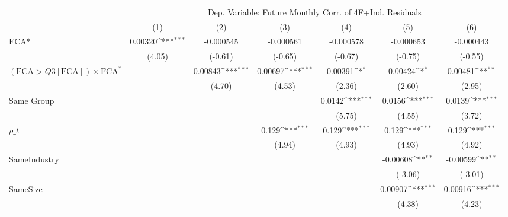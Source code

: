 {
\def\sym#1{\ifmmode^{#1}\else\(^{#1}\)\fi}
\begin{tabular}{l*{6}{c}}
\hline\hline
                &\multicolumn{6}{c}{Dep. Variable: Future Monthly Corr. of 4F+Ind. Residuals}                                     \\\cmidrule(lr){2-7}
                &\multicolumn{1}{c}{(1)}         &\multicolumn{1}{c}{(2)}         &\multicolumn{1}{c}{(3)}         &\multicolumn{1}{c}{(4)}         &\multicolumn{1}{c}{(5)}         &\multicolumn{1}{c}{(6)}         \\
\hline
$ \text{FCA*} $ &  0.00320\sym{***}&-0.000545         &-0.000561         &-0.000578         &-0.000653         &-0.000443         \\
                &   (4.05)         &  (-0.61)         &  (-0.65)         &  (-0.67)         &  (-0.75)         &  (-0.55)         \\
[1em]
 $ (\text{FCA} > Q3[\text{FCA}]) \times {\text{FCA} ^*}  $ &                  &  0.00843\sym{***}&  0.00697\sym{***}&  0.00391\sym{*}  &  0.00424\sym{*}  &  0.00481\sym{**} \\
                &                  &   (4.70)         &   (4.53)         &   (2.36)         &   (2.60)         &   (2.95)         \\
[1em]
Same Group      &                  &                  &                  &   0.0142\sym{***}&   0.0156\sym{***}&   0.0139\sym{***}\\
                &                  &                  &                  &   (5.75)         &   (4.55)         &   (3.72)         \\
[1em]
 $ {\rho\_t} $   &                  &                  &    0.129\sym{***}&    0.129\sym{***}&    0.129\sym{***}&    0.129\sym{***}\\
                &                  &                  &   (4.94)         &   (4.93)         &   (4.93)         &   (4.92)         \\
[1em]
SameIndustry    &                  &                  &                  &                  & -0.00608\sym{**} & -0.00599\sym{**} \\
                &                  &                  &                  &                  &  (-3.06)         &  (-3.01)         \\
[1em]
SameSize        &                  &                  &                  &                  &  0.00907\sym{***}&  0.00916\sym{***}\\
                &                  &                  &                  &                  &   (4.38)         &   (4.23)         \\

\end{tabular}}
